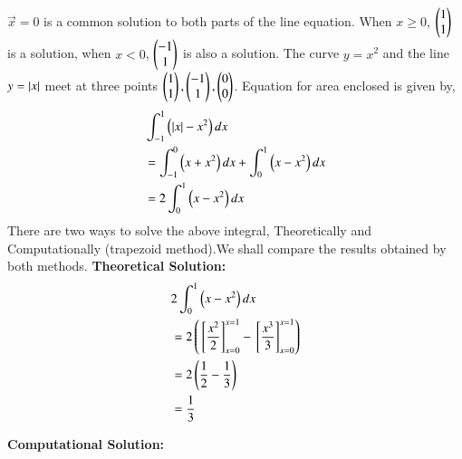 \documentclass[journal]{IEEEtran}
\begin{document}
$\vec{x}=0$ is a common solution to both parts of the line equation. When $x\ge0$, $\begin{pmatrix}1\\1\end{pmatrix}$ is a solution, when $x<0$, $\begin{pmatrix}-1\\1\end{pmatrix}$ is also a solution.\newline
The curve $y=x^2$ and the line $y=\left\vert x\right\vert$ meet at three points $\begin{pmatrix}1\\1\end{pmatrix}, \begin{pmatrix}-1\\1\end{pmatrix}, \begin{pmatrix}0\\0\end{pmatrix}$.
Equation for area enclosed is given by,
\begin{align}
  &\int_{-1}^1\left(\left\vert x\right\vert-x^2\right)dx\\
  &=\int_{-1}^{0}\left(x+x^2\right)dx + \int_0^1\left(x-x^2\right)dx\\
  &=2\int_0^1\left(x-x^2\right)dx
\end{align}
There are two ways to solve the above integral, Theoretically and Computationally (trapezoid method).We shall compare the results obtained by both methods.\newline
\textbf{Theoretical Solution:}\newline
\begin{align}
  &2\int_0^1 \left(x-x^2\right)dx\\
  &=2\left({}\left[\frac{x^2}{2}\right]_{x=0}^{x=1} -{}\left[\frac{x^3}{3}\right]_{x=0}^{x=1}\right)\\
  &=2\left(\frac{1}{2}-\frac{1}{3}\right)\\
  &=\frac{1}{3}
\end{align}

\textbf{Computational Solution:}\newline
\end{document}
